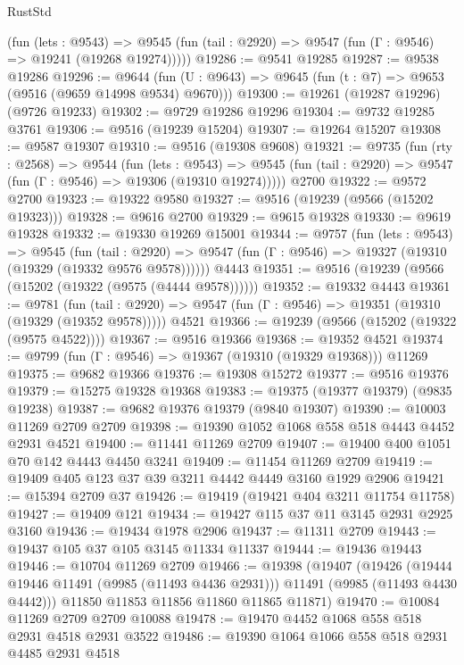 \begin{lexlean}{RustStd}
\begin{coremodule}
      (fun (lets : @9543) =>
      @9545 (fun (tail : @2920) => @9547 (fun (Γ : @9546) => @19241 (@19268 @19274)))))
@19286 := @9541 @19285
@19287 := @9538 @19286
@19296 := @9644
    (fun (U : @9643) => @9645 (fun (t : @7) => @9653 (@9516 (@9659 @14998 @9534) @9670)))
@19300 := @19261 (@19287 @19296) (@9726 @19233)
@19302 := @9729 @19286 @19296
@19304 := @9732 @19285 @3761
@19306 := @9516 (@19239 @15204)
@19307 := @19264 @15207
@19308 := @9587 @19307
@19310 := @9516 (@19308 @9608)
@19321 := @9735
    (fun (rty : @2568) =>
    @9544
      (fun (lets : @9543) =>
      @9545 (fun (tail : @2920) => @9547 (fun (Γ : @9546) => @19306 (@19310 @19274)))))
    @2700
@19322 := @9572 @2700
@19323 := @19322 @9580
@19327 := @9516 (@19239 (@9566 (@15202 @19323)))
@19328 := @9616 @2700
@19329 := @9615 @19328
@19330 := @9619 @19328
@19332 := @19330 @19269 @15001
@19344 := @9757
    (fun (lets : @9543) =>
    @9545
      (fun (tail : @2920) =>
      @9547 (fun (Γ : @9546) => @19327 (@19310 (@19329 (@19332 @9576 @9578))))))
    @4443
@19351 := @9516 (@19239 (@9566 (@15202 (@19322 (@9575 (@4444 @9578))))))
@19352 := @19332 @4443
@19361 := @9781
    (fun (tail : @2920) => @9547 (fun (Γ : @9546) => @19351 (@19310 (@19329 (@19352 @9578)))))
    @4521
@19366 := @19239 (@9566 (@15202 (@19322 (@9575 @4522))))
@19367 := @9516 @19366
@19368 := @19352 @4521
@19374 := @9799 (fun (Γ : @9546) => @19367 (@19310 (@19329 @19368))) @11269
@19375 := @9682 @19366
@19376 := @19308 @15272
@19377 := @9516 @19376
@19379 := @15275 @19328 @19368
@19383 := @19375 (@19377 @19379) (@9835 @19238)
@19387 := @9682 @19376 @19379 (@9840 @19307)
@19390 := @10003 @11269 @2709 @2709
@19398 := @19390 @1052 @1068 @558 @518 @4443 @4452 @2931 @4521
@19400 := @11441 @11269 @2709
@19407 := @19400 @400 @1051 @70 @142 @4443 @4450 @3241
@19409 := @11454 @11269 @2709
@19419 := @19409 @405 @123 @37 @39 @3211 @4442 @4449 @3160 @1929 @2906
@19421 := @15394 @2709 @37
@19426 := @19419 (@19421 @404 @3211 @11754 @11758)
@19427 := @19409 @121
@19434 := @19427 @115 @37 @11 @3145 @2931 @2925 @3160
@19436 := @19434 @1978 @2906
@19437 := @11311 @2709
@19443 := @19437 @105 @37 @105 @3145 @11334 @11337
@19444 := @19436 @19443
@19446 := @10704 @11269 @2709
@19466 := @19398
    (@19407
      (@19426
        (@19444 @19446 @11491 (@9985 (@11493 @4436 @2931)))
        @11491
        (@9985 (@11493 @4430 @4442)))
      @11850
      @11853
      @11856
      @11860
      @11865
      @11871)
@19470 := @10084 @11269 @2709 @2709 @10088
@19478 := @19470 @4452 @1068 @558 @518 @2931 @4518 @2931 @3522
@19486 := @19390 @1064 @1066 @558 @518 @2931 @4485 @2931 @4518

\end{coremodule}
\end{lexlean}
